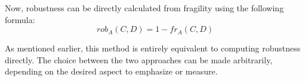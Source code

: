 Now, robustness can be directly calculated from fragility using the following formula:
\[
	rob_A(C,D) = 1 - fr_A(C,D)
\]

As mentioned earlier, this method is entirely equivalent to computing robustness directly. The choice between the two approaches can be made arbitrarily, depending on the desired aspect to emphasize or measure.